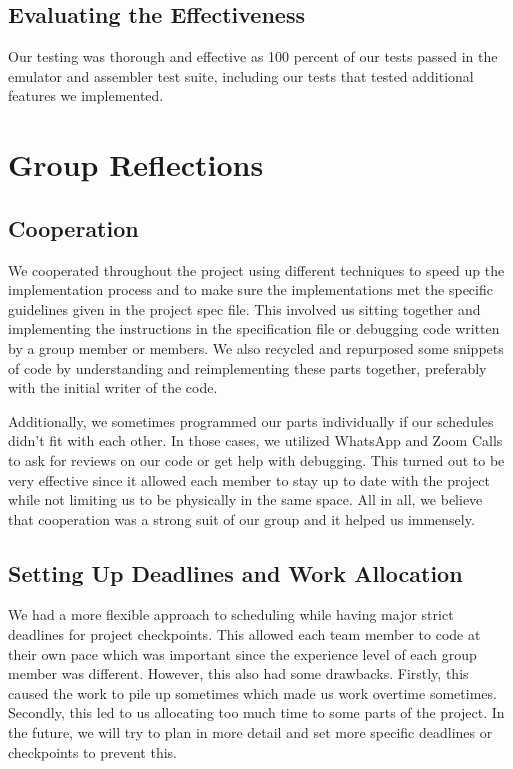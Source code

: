 \documentclass[11pt]{article}
\begin{document}
\subsection{Evaluating the Effectiveness}
Our testing was thorough and effective as 100 percent of our tests passed in the emulator and assembler test suite, including our tests that tested additional features we implemented.


\section{Group Reflections}
\subsection{Cooperation}

We cooperated throughout the project using different techniques to speed up the implementation process and to make sure the implementations met the specific guidelines given in the project spec file. This involved us sitting together and implementing the instructions in the specification file or debugging code written by a group member or members. We also recycled and repurposed some snippets of code by understanding and reimplementing these parts together, preferably with the initial writer of the code.

Additionally, we sometimes programmed our parts individually if our schedules didn’t fit with each other. In those cases, we utilized WhatsApp and Zoom Calls to ask for reviews on our code or get help with debugging. This turned out to be very effective since it allowed each member to stay up to date with the project while not limiting us to be physically in the same space. All in all, we believe that cooperation was a strong suit of our group and it helped us immensely. 


\subsection{Setting Up Deadlines and Work Allocation}

We had a more flexible approach to scheduling while having major strict deadlines for project checkpoints. This allowed each team member to code at their own pace which was important since the experience level of each group member was different. However, this also had some drawbacks. Firstly, this caused the work to pile up sometimes which made us work overtime sometimes. Secondly, this led to us allocating too much time to some parts of the project. In the future, we will try to plan in more detail and set more specific deadlines or checkpoints to prevent this. 
\end{document}
